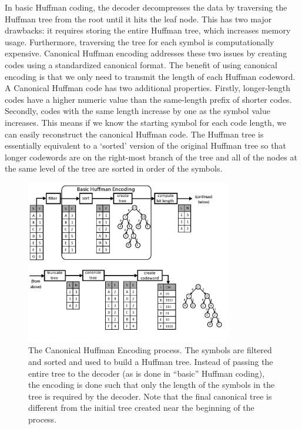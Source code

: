 \documentclass[a4paper,12pt,twoside]{article}
\begin{document}
In basic Huffman coding, the decoder decompresses the data by traversing the Huffman tree from the root until it hits the leaf node. This has two major drawbacks: it requires storing the entire Huffman tree, which increases memory usage. Furthermore, traversing the tree for each symbol is computationally expensive. Canonical Huffman encoding addresses these two issues by creating codes using a standardized canonical format. The benefit of using canonical encoding is that we only need to transmit the length of each Huffman codeword. A Canonical Huffman code has two additional properties. Firstly, longer-length codes have a higher numeric value than the same-length prefix of shorter codes. Secondly, codes with the same length increase by one as the symbol value increases. This means if we know the starting symbol for each code length, we can easily reconstruct the canonical Huffman code. The Huffman tree is essentially equivalent to a ‘sorted’ version of the original Huffman tree so that longer codewords are on the right-most branch of the tree and all of the nodes at the same level of the tree are sorted in order of the symbols.
\begin{figure}[H]
    \centering
    \includegraphics[width=0.8\textwidth]{images/1.jpg}
    \caption{The Canonical Huffman Encoding process. The symbols are filtered and sorted and used to build a Huffman tree. Instead of passing the entire tree to the decoder (as is done in “basic” Huffman coding), the encoding is done such that only the length of the symbols in the tree is required by the decoder. Note that the final canonical tree is different from the initial tree created near the beginning of the process.}
\end{figure}
\end{document}
